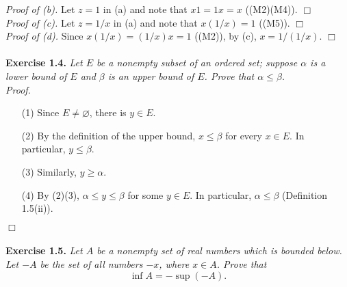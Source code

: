 \documentclass{article}
\begin{document}
\emph{Proof of (b).}
Let $z = 1$ in (a) and note that $x1 = 1x = x$ ((M2)(M4)).
$\Box$ \\

\emph{Proof of (c).}
Let $z = 1/x$ in (a) and note that $x(1/x) = 1$ ((M5)).
$\Box$ \\

\emph{Proof of (d).}
Since $x(1/x) = (1/x)x = 1$ ((M2)), by (c), $x = 1/(1/x)$.
$\Box$ \\\\






\textbf{Exercise 1.4.}
\emph{Let $E$ be a nonempty subset of an ordered set;
suppose $\alpha$ is a lower bound of $E$ and
$\beta$ is an upper bound of $E$.
Prove that $\alpha \leq \beta$.} \\

\emph{Proof.}
\begin{enumerate}
\item[(1)]
Since $E \neq \varnothing$, there is $y \in E$.
\item[(2)]
By the definition of the upper bound,
$x \leq \beta$ for every $x \in E$.
In particular, $y \leq \beta$.
\item[(3)]
Similarly, $y \geq \alpha$.
\item[(4)]
By (2)(3), $\alpha \leq y \leq \beta$ for some $y \in E$.
In particular, $\alpha \leq \beta$ (Definition 1.5(ii)).
\end{enumerate}
$\Box$ \\\\






\textbf{Exercise 1.5.}
\emph{Let $A$ be a nonempty set of real numbers which is bounded below.
Let $-A$ be the set of all numbers $-x$, where $x \in A$.
Prove that $$\inf A = -\sup(-A).$$}
\end{document}

